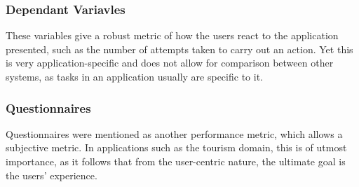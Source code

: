 \subsubsection{Dependant Variavles}
These variables give a robust metric of how the users react to the 
application presented, such as the number of attempts taken to carry out an action.
Yet this is very application-specific and does not allow for comparison between other systems, as 
tasks in an application usually are specific to it.
\\

\subsubsection{Questionnaires}
Questionnaires were mentioned as another performance metric, which allows a subjective metric. 
In applications such as the tourism domain, this is of utmost importance, as it follows that 
from the user-centric nature, the ultimate goal is the users' experience.  
